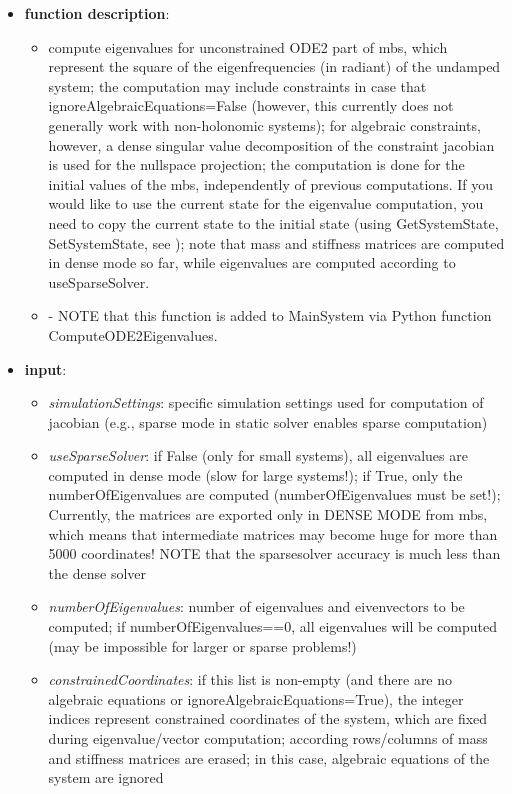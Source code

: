 \begin{itemize}[leftmargin=0.7cm]
\item[--]
{\bf function description}: \vspace{-6pt}
\begin{itemize}[leftmargin=1.2cm]
\setlength{\itemindent}{-0.7cm}
\item[]compute eigenvalues for unconstrained ODE2 part of mbs, which represent the square of the eigenfrequencies (in radiant) of the undamped system; the computation may include constraints in case that ignoreAlgebraicEquations=False (however, this currently does not generally work with non-holonomic systems); for algebraic constraints, however, a dense singular value decomposition of the constraint jacobian is used for the nullspace projection; the computation is done for the initial values of the mbs, independently of previous computations. If you would like to use the current state for the eigenvalue computation, you need to copy the current state to the initial state (using GetSystemState, SetSystemState, see ); note that mass and stiffness matrices are computed in dense mode so far, while eigenvalues are computed according to useSparseSolver.
\item[]- NOTE that this function is added to MainSystem via Python function ComputeODE2Eigenvalues.
\end{itemize}
\item[--]
{\bf input}: \vspace{-6pt}
\begin{itemize}[leftmargin=1.2cm]
\setlength{\itemindent}{-0.7cm}
\item[]{\it simulationSettings}: specific simulation settings used for computation of jacobian (e.g., sparse mode in static solver enables sparse computation)
\item[]{\it useSparseSolver}: if False (only for small systems), all eigenvalues are computed in dense mode (slow for large systems!); if True, only the numberOfEigenvalues are computed (numberOfEigenvalues must be set!); Currently, the matrices are exported only in DENSE MODE from mbs, which means that intermediate matrices may become huge for more than 5000 coordinates! NOTE that the sparsesolver accuracy is much less than the dense solver
\item[]{\it numberOfEigenvalues}: number of eigenvalues and eivenvectors to be computed; if numberOfEigenvalues==0, all eigenvalues will be computed (may be impossible for larger or sparse problems!)
\item[]{\it constrainedCoordinates}: if this list is non-empty (and there are no algebraic equations or ignoreAlgebraicEquations=True), the integer indices represent constrained coordinates of the system, which are fixed during eigenvalue/vector computation; according rows/columns of mass and stiffness matrices are erased; in this case, algebraic equations of the system are ignored

\end{itemize}
\end{itemize}
